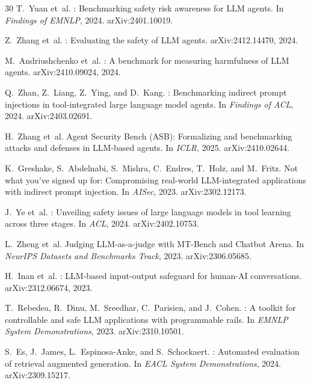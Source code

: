 ﻿\documentclass[11pt]{article}
\begin{document}
\begin{thebibliography}{30}
T.~Yuan et~al.
: Benchmarking safety risk awareness for {LLM} agents.
\newblock In \emph{Findings of EMNLP}, 2024.
\newblock arXiv:2401.10019.

Z.~Zhang et~al.
: Evaluating the safety of {LLM} agents.
\newblock arXiv:2412.14470, 2024.

M.~Andriushchenko et~al.
: A benchmark for measuring harmfulness of {LLM} agents.
\newblock arXiv:2410.09024, 2024.

Q.~Zhan, Z.~Liang, Z.~Ying, and D.~Kang.
: Benchmarking indirect prompt injections in
  tool-integrated large language model agents.
\newblock In \emph{Findings of ACL}, 2024.
\newblock arXiv:2403.02691.

H.~Zhang et~al.
\newblock Agent Security Bench ({ASB}): Formalizing and benchmarking attacks
  and defenses in {LLM}-based agents.
\newblock In \emph{ICLR}, 2025.
\newblock arXiv:2410.02644.

K.~Greshake, S.~Abdelnabi, S.~Mishra, C.~Endres, T.~Holz, and M.~Fritz.
\newblock Not what you've signed up for: Compromising real-world
  {LLM}-integrated applications with indirect prompt injection.
\newblock In \emph{AISec}, 2023.
\newblock arXiv:2302.12173.

J.~Ye et~al.
: Unveiling safety issues of large language models in
  tool learning across three stages.
\newblock In \emph{ACL}, 2024.
\newblock arXiv:2402.10753.

L.~Zheng et~al.
\newblock Judging {LLM}-as-a-judge with {MT-Bench} and {Chatbot Arena}.
\newblock In \emph{NeurIPS Datasets and Benchmarks Track}, 2023.
\newblock arXiv:2306.05685.

H.~Inan et~al.
: {LLM}-based input-output safeguard for human-{AI}
  conversations.
\newblock arXiv:2312.06674, 2023.

T.~Rebedea, R.~Dinu, M.~Sreedhar, C.~Parisien, and J.~Cohen.
: A toolkit for controllable and safe {LLM}
  applications with programmable rails.
\newblock In \emph{EMNLP System Demonstrations}, 2023.
\newblock arXiv:2310.10501.

S.~Es, J.~James, L.~Espinosa-Anke, and S.~Schockaert.
: Automated evaluation of retrieval augmented generation.
\newblock In \emph{EACL System Demonstrations}, 2024.
\newblock arXiv:2309.15217.


\end{thebibliography}
\end{document}
